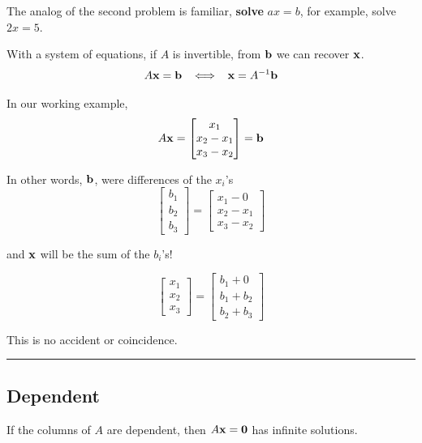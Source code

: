 The analog of the second problem is familiar, \textbf{solve} $ax = b$, for example, solve $2x = 5$.  

With a system of equations, if $A$ is invertible, from  ${\bf b}$ we can recover ${\bf x}$.  
\[  A{\bf x} = {\bf b}  \;\;\;  \Longleftrightarrow   \;\;\;  {\bf x} = A^{-1} {\bf b} \] 


In our working example,
\[  A {\bf x} =  \begin{bmatrix} x_1 \\ x_2 - x_1 \\ x_3 - x_2   \end{bmatrix} = {\bf b} \]

In other words, ${\bf b}$, were differences  of the $x_i$'s
\[   \begin{bmatrix} b_1 \\ b_2  \\ b_3   \end{bmatrix}  =  \begin{bmatrix} x_1 - 0 \\ x_2 - x_1 \\ x_3 - x_2   \end{bmatrix}  \]

and ${\bf x}$ will be the sum of the $b_i$'s!

\[   \begin{bmatrix} x_1 \\ x_2  \\ x_3   \end{bmatrix}  =  \begin{bmatrix} b_1 + 0  \\ b_1 + b_2 \\ b_2 + b_3   \end{bmatrix}  \]

This is no accident or coincidence.  

\rule[0.01in]{\textwidth}{0.0025in}

 
 
 
 
 \subsection{Dependent}
If the columns of $A$ are dependent, then $A {\bf x} = {\bf 0}$ has infinite solutions.  



